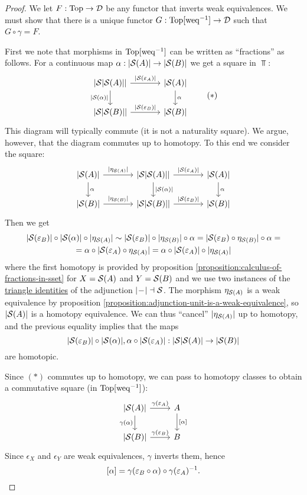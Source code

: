 \begin{proof}
We let $F:\Top\to\Dd$ be any functor that inverts weak equivalences. We must show that there is a unique functor $G:\Top[\weq^\inv]\to\Dd$ such that $G\circ\gamma=F$.

First we note that morphisms in $\Top[\weq^\inv]$ can be written as \enquote{fractions} as follows. For a continuous map $\alpha:|\S(A)|\to|\S(B)|$ we get a square in $\Top$:
\[
\begin{tikzcd}[column sep=large]
 {|\S|\S(A)||} \ar[d,"{|\S(\alpha)|}"'] \ar[r,"{|\S(\epsilon_A)|}"] & {|\S(A)|} \ar[d,"\alpha"]\\
 {|\S|\S(B)||} \ar[r,"{|\S(\epsilon_B)|}"] & {|\S(B)|}
\end{tikzcd}\tag{$*$}
\]
This diagram will typically  commute (it is not a naturality square). We argue, however, that the diagram commutes up to homotopy. To this end we consider the square:
\[
\begin{tikzcd}[column sep=large]
 {|\S(A)|} \ar[d,"\alpha"] \ar[r,"{|\eta_{\S(A)}|}"] & {|\S|\S(A)||} \ar[d,"{|\S(\alpha)|}"] \ar[r,"{|\S(\epsilon_A)|}"] & {|\S(A)|} \ar[d,"\alpha"]\\
 {|\S(B)|} \ar[r,"{|\eta_{\S(B)}|}"] & {|\S|\S(B)||} \ar[r,"{|\S(\epsilon_B)|}"] & {|\S(B)|}
\end{tikzcd}
\]
Then we get
\begin{multline*}
    |\S(\epsilon_B)|\circ|\S(\alpha)|\circ|\eta_{\S(A)}|\sim|\S(\epsilon_B)|\circ|\eta_{\S(B)}|\circ\alpha=|\S(\epsilon_B)\circ\eta_{\S(B)}|\circ\alpha=\\
    =\alpha\circ|\S(\epsilon_A)\circ\eta_{\S(A)}|=\alpha\circ|\S(\epsilon_A)|\circ|\eta_{\S(A)}|
\end{multline*}
where the first homotopy is provided by proposition \ref{proposition:calculus-of-fractions-in-sset} for $X=\S(A)$ and $Y=\S(B)$ and we use two instances of the \href{http://nlab-pages.s3.us-east-2.amazonaws.com/nlab/show/triangle+identities}{triangle identities} of the adjunction $|\!-\!|\dashv\S$. The morphism $\eta_{\S(A)}$ is a weak equivalence by proposition \ref{proposition:adjunction-unit-is-a-weak-equivalence}, so $|\S(A)|$ is a homotopy equivalence. We can thus \enquote{cancel} $|\eta_{\S(A)}|$ up to homotopy, and the previous equality implies that the maps
\[|\S(\epsilon_B)|\circ|\S(\alpha)|,\alpha\circ|\S(\epsilon_A)|:|\S|\S(A)|\to|\S(B)|\]
are homotopic.

Since $(*)$ commutes up to homotopy, we can pass to homotopy classes to obtain a commutative square (in $\Top[\weq^\inv]$):
\[
\begin{tikzcd}
 {|\S(A)|} \ar[d,"\gamma(\alpha)"'] \ar[r,"\gamma(\epsilon_A)"] & A \ar[d,"{[\alpha]}"]\\
 {|\S(B)|} \ar[r,"\gamma(\epsilon_B)"] & B
\end{tikzcd}
\]
Since $\epsilon_X$ and $\epsilon_Y$ are weak equivalences, $\gamma$ inverts them, hence
\[[\alpha]=\gamma(\epsilon_B\circ\alpha)\circ\gamma(\epsilon_A)^\inv.\]


\end{proof}
